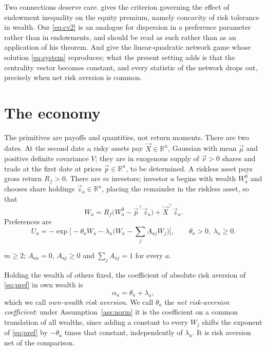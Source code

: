 Two connections deserve care. \cite{gollier} gives the criterion governing the
effect of endowment inequality on the equity premium, namely concavity of risk
tolerance in wealth. Our \eqref{eq:cv2} is an analogue for dispersion in a
preference parameter rather than in endowments, and should be read as such
rather than as an application of his theorem. And \cite{ballester} give the
linear-quadratic network game whose solution \eqref{eq:system} reproduces; what
the present setting adds is that the centrality vector becomes constant, and
every statistic of the network drops out, precisely when net risk aversion is
common.

\section{The economy}

The primitives are payoffs and quantities, not return moments. There are two
dates. At the second date $n$ risky assets pay $\vec X\in\mathbb{R}^n$, Gaussian
with mean $\vec\mu$ and positive definite covariance $V$; they are in exogenous
supply of $\vec\nu>0$ shares and trade at the first date at prices
$\vec p\in\mathbb{R}^n$, to be determined. A riskless asset pays gross return
$R_f>0$. There are $m$ investors; investor $a$ begins with wealth $W_a^0$ and
chooses share holdings $\vec z_a\in\mathbb{R}^n$, placing the remainder in the
riskless asset, so that
%
\begin{equation}
W_a=R_f\big(W_a^0-\vec p^{\top}\vec z_a\big)+\vec X^{\top}\vec z_a .
\label{eq:wealth}
\end{equation}
%
Preferences are
%
\begin{equation}
U_a=-\exp\Big[-\theta_a W_a-\lambda_a\Big(W_a-\sum_jA_{aj}W_j\Big)\Big],
\qquad \theta_a>0,\ \lambda_a\geq0 .
\label{eq:pref}
\end{equation}

\begin{assumption}
\label{ass:norm}
$m\geq2$; $A_{aa}=0$, $A_{aj}\geq0$ and $\sum_jA_{aj}=1$ for every $a$.
\end{assumption}

\begin{definition}
\label{def:two}
Holding the wealth of others fixed, the coefficient of absolute risk aversion
of \eqref{eq:pref} in own wealth is
%
\begin{equation}
\alpha_a=\theta_a+\lambda_a ,
\label{eq:alpha}
\end{equation}
%
which we call \emph{own-wealth risk aversion}. We call $\theta_a$ the
\emph{net risk-aversion coefficient}: under Assumption~\ref{ass:norm} it is the
coefficient on a common translation of all wealths, since adding a constant to
every $W_j$ shifts the exponent of \eqref{eq:pref} by $-\theta_a$ times that
constant, independently of $\lambda_a$. It is risk aversion net of the
comparison.
\end{definition}

